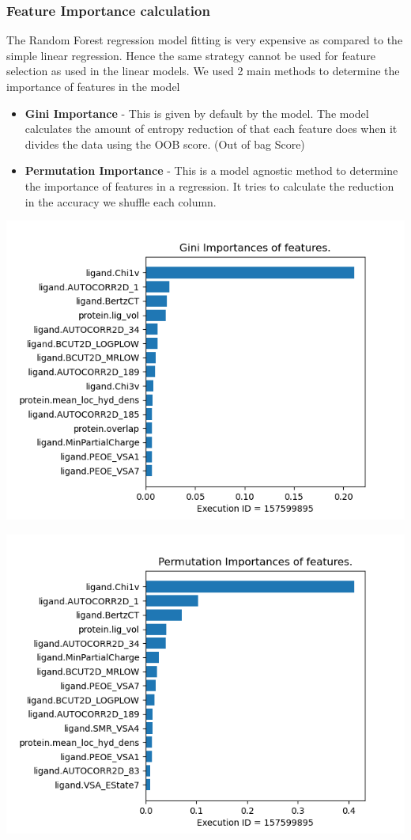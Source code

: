 \documentclass[11pt]{article}
\begin{document}
\subsubsection{Feature Importance calculation}
The Random Forest regression model fitting is very expensive as compared to the simple linear regression.
Hence the same strategy cannot be used for feature selection as used in the linear models.
We used 2 main methods to determine the importance of features in the model
\begin{itemize}
\item \textbf{Gini Importance} - This is given by default by the model. The model 
calculates the amount of entropy reduction of that each feature does when it divides the data using the OOB score. (Out of bag Score)
\item \textbf{Permutation Importance} - This is a model agnostic method to determine the importance of features in a regression. 
It tries to calculate the reduction in the accuracy we shuffle each column.
\end{itemize}
\includegraphics[scale=0.7]{Gini_importance}

\includegraphics[scale=0.7]{Permutation_importance}
\end{document}
